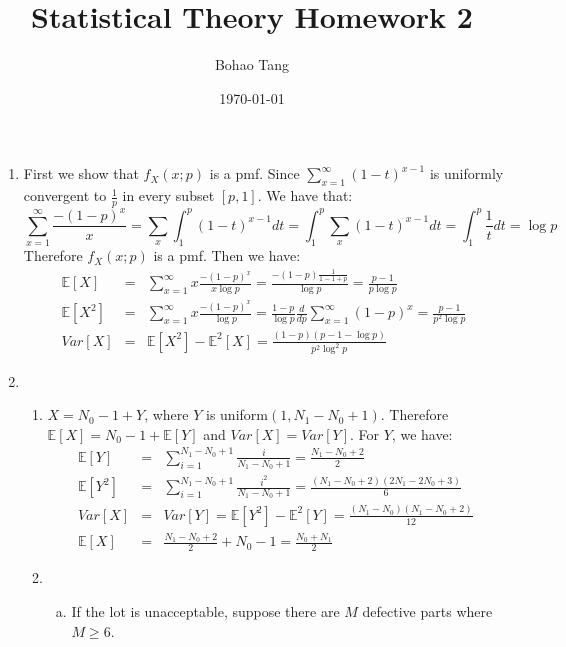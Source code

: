 \documentclass[12pt]{article}
\title{Statistical Theory Homework 2}
\date{\today}
\author{Bohao Tang}
\begin{document}

\maketitle

\begin{enumerate}
    \item
    First we show that $f_X(x;p)$ is a pmf. Since $\sum_{x=1}^{\infty} (1 - t)^{x-1}$ is uniformly convergent to $\frac{1}{p}$ in every subset $[p,1]$.
    We have that:
    $$\sum_{x=1}^{\infty} \frac{-(1-p)^x}{x} = \sum_x \int_1^p (1-t)^{x-1} d t= \int_1^p \sum_x (1-t)^{x-1} d t= \int_1^p \frac{1}{t} d t = \log{p}$$
    Therefore $f_X(x;p)$ is a pmf.
    Then we have:
    \begin{eqnarray}
        \mathbb{E} [X] &=& \sum_{x=1}^{\infty} x \frac{-(1-p)^x}{x \log{p}} = \frac{-(1-p) \frac{1}{1-1+p}}{\log{p}} = \frac{p-1}{p \log{p}} \\
        \mathbb{E} [X^2] &=& \sum_{x=1}^{\infty} x \frac{-(1-p)^x}{\log{p}} = \frac{1-p}{\log{p}} \frac{d }{d p} \sum_{x=1}^{\infty} (1-p)^x = \frac{p-1}{p^2\log{p}} \\
        Var[X] &=& \mathbb{E} [X^2] - \mathbb{E}^2 [X] = \frac{(1-p)(p-1-\log{p})}{p^2 \log^2{p}}
    \end{eqnarray}
    \item
    \begin{enumerate}[3.1]
        \item
        $X = N_0 - 1 + Y$, where $Y$ is uniform$(1, N_1 - N_0 + 1)$. Therefore $\mathbb{E}[X] = N_0-1+ \mathbb{E}[Y]$ and $Var[X] = Var[Y]$.
        For $Y$, we have:
        \begin{eqnarray}
            \mathbb{E}[Y] &=& \sum_{i=1}^{N_1 - N_0 + 1} \frac{i}{N_1 - N_0 + 1} = \frac{N_1 - N_0 + 2}{2} \\
            \mathbb{E}[Y^2] &=& \sum_{i=1}^{N_1 - N_0 + 1} \frac{i^2}{N_1 - N_0 + 1} = \frac{(N_1 - N_0 + 2)(2N_1 - 2N_0 + 3)}{6} \\
            Var[X] &=& Var[Y] = \mathbb{E} [Y^2] - \mathbb{E}^2 [Y] = \frac{(N_1-N_0)(N_1-N_0+2)}{12} \\
            \mathbb{E}[X] &=& \frac{N_1 - N_0 + 2}{2} + N_0 -1 = \frac{N_0+N_1}{2}        
        \end{eqnarray}
        \item
        \begin{enumerate}[(a)]
            \item
            If the lot is unacceptable, suppose there are $M$ defective parts where $M \ge 6$.

\end{enumerate}
\end{enumerate}
\end{enumerate}
\end{document}
